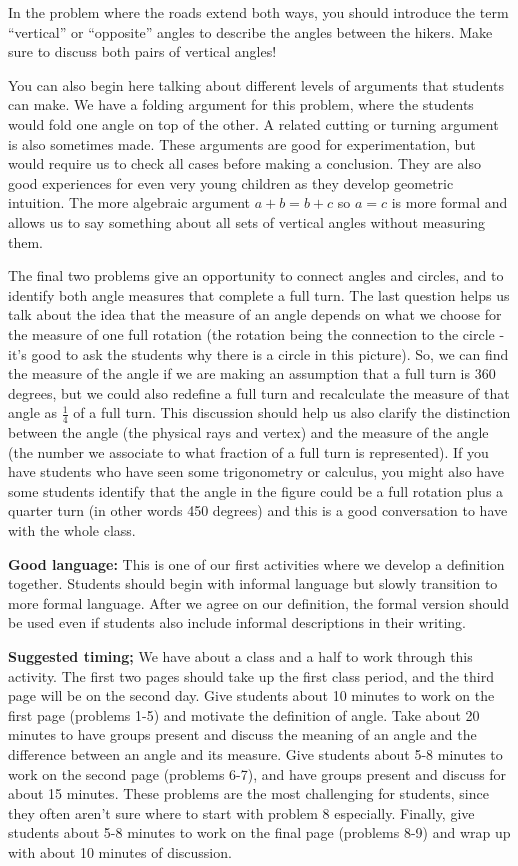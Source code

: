 \documentclass[nooutcomes,noauthor]{ximera}
\begin{document}
\begin{instructorNotes}
In the problem where the roads extend both ways, you should introduce the term ``vertical'' or ``opposite'' angles to describe the angles between the hikers.  Make sure to discuss both pairs of vertical angles!

You can also begin here talking about different levels of arguments that students can make.  We have a folding argument for this problem, where the students would fold one angle on top of the other.  A related cutting or turning argument is also sometimes made.  These arguments are good for experimentation, but would require us to check all cases before making a conclusion.  They are also good experiences for even very young children as they develop geometric intuition.  The more algebraic argument $a+b = b+c$ so $a = c$ is more formal and allows us to say something about all sets of vertical angles without measuring them.

The final two problems give an opportunity to connect angles and circles, and to identify both angle measures that complete a full turn. The last question helps us talk about the idea that the measure of an angle depends on what we choose for the measure of one full rotation (the rotation being the connection to the circle - it's good to ask the students why there is a circle in this picture). So, we can find the measure of the angle if we are making an assumption that a full turn is $360$ degrees, but we could also redefine a full turn and recalculate the measure of that angle as $\frac{1}{4}$ of a full turn. This discussion should help us also clarify the distinction between the angle (the physical rays and vertex) and the measure of the angle (the number we associate to what fraction of a full turn is represented). If you have students who have seen some trigonometry or calculus, you might also have some students identify that the angle in the figure could be a full rotation plus a quarter turn (in other words 450 degrees) and this is a good conversation to have with the whole class.


{\bf Good language:} This is one of our first activities where we develop a definition together. Students should begin with informal language but slowly transition to more formal language. After we agree on our definition, the formal version should be used even if students also include informal descriptions in their writing.


{\bf Suggested timing;} We have about a class and a half to work through this activity. The first two pages should take up the first class period, and the third page will be on the second day. Give students about 10 minutes to work on the first page (problems 1-5) and motivate the definition of angle. Take about 20 minutes to have groups present and discuss the meaning of an angle and the difference between an angle and its measure.  Give students about 5-8 minutes to work on the second page (problems 6-7), and have groups present and discuss for about 15 minutes. These problems are the most challenging for students, since they often aren't sure where to start with problem 8 especially. Finally, give students about 5-8 minutes to work on the final page (problems 8-9) and wrap up with about 10 minutes of discussion.

\end{instructorNotes}
\end{document}
